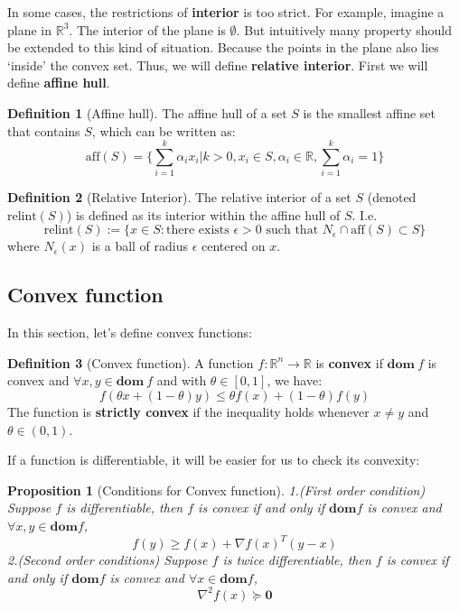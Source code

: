 \documentclass[
]{book}
\newtheorem{proposition}{Proposition}[chapter]
\theoremstyle{definition}
\newtheorem{definition}{Definition}[chapter]
\theoremstyle{definition}
\theoremstyle{definition}
\theoremstyle{definition}
\theoremstyle{remark}
\begin{document}
In some cases, the restrictions of \textbf{interior} is too strict. For example, imagine a plane in \(\mathbb{R}^3\). The interior of the plane is \(\emptyset\). But intuitively many property should be extended to this kind of situation. Because the points in the plane also lies `inside' the convex set. Thus, we will define \textbf{relative interior}. First we will define \textbf{affine hull}.

\begin{definition}[Affine hull]
\protect\hypertarget{def:affinehull}{}\label{def:affinehull}The affine hull of a set \(S\) is the smallest affine set that contains \(S\), which can be written as:
\[\text{aff}(S) = \{\sum_{i=1}^k\alpha_ix_i|k>0,x_i\in S,\alpha_i\in\mathbb{R},\sum_{i=1}^k\alpha_i=1\}\]
\end{definition}

\begin{definition}[Relative Interior]
\protect\hypertarget{def:relint}{}\label{def:relint}The relative interior of a set \(S\) (denoted \(\text{relint}(S)\)) is defined as its interior within the affine hull of \(S\). I.e.
\[\text{relint}(S):=\{x\in S: \text{there exists } \epsilon>0 \text{ such that }N_\epsilon \cap \text{aff}(S)\subset S\}\]
where \(N_\epsilon(x)\) is a ball of radius \(\epsilon\) centered on \(x\).
\end{definition}

\subsection{Convex function}\label{appconvex-theory-convexfunction}

In this section, let's define convex functions:

\begin{definition}[Convex function]
\protect\hypertarget{def:defcvxfunc}{}\label{def:defcvxfunc}A function \(f:\mathbb{R}^n\to\mathbb{R}\) is \textbf{convex} if \(\textbf{dom}\ f\) is convex and \(\forall x,y\in \textbf{dom}\ f\) and with \(\theta \in [0,1]\), we have:\[f(\theta x +(1-\theta)y)\leq \theta f(x) + (1-\theta)f(y)\]
The function is \textbf{strictly convex} if the inequality holds whenever \(x\neq y\) and \(\theta\in (0,1)\).
\end{definition}

If a function is differentiable, it will be easier for us to check its convexity:

\begin{proposition}[Conditions for Convex function]
\protect\hypertarget{prp:decidecvx}{}\label{prp:decidecvx}1.(First order condition) Suppose \(f\) is differentiable, then \(f\) is convex if and only if \(\textbf{dom} f\) is convex and \(\forall x,y\in \textbf{dom} f\), \[f(y)\geq f(x) +\nabla f(x)^T(y-x)\]
2.(Second order conditions) Suppose \(f\) is twice differentiable, then \(f\) is convex if and only if \(\textbf{dom} f\) is convex and \(\forall x\in \textbf{dom} f\), \[\nabla^2 f(x) \succeq \textbf{0}\]
\end{proposition}
\end{document}
